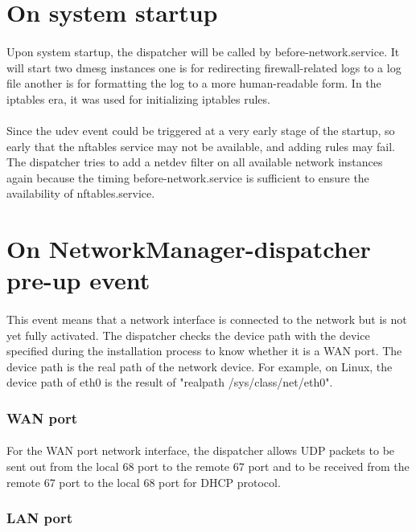 \documentclass[mscthesis]{usiinfthesis}
\begin{document}
\section{On system startup}
\paragraph{}
Upon system startup, the dispatcher will be called by before-network.service. It will start two dmesg instances one is for redirecting firewall-related logs to a log file another is for formatting the log to a more human-readable form. In the iptables era, it was used for initializing iptables rules.
\paragraph{}
Since the udev event could be triggered at a very early stage of the startup, so early that the nftables service may not be available, and adding rules may fail. The dispatcher tries to add a netdev filter on all available network instances again because the timing before-network.service is sufficient to ensure the availability of nftables.service.

\section{On NetworkManager-dispatcher pre-up event}
\paragraph{}
This event means that a network interface is connected to the network but is not yet fully activated. The dispatcher checks the device path with the device specified during the installation process to know whether it is a WAN port. The device path is the real path of the network device. For example, on Linux, the device path of eth0 is the result of "realpath /sys/class/net/eth0".
\subsubsection{WAN port}
\paragraph{}
For the WAN port network interface, the dispatcher allows UDP packets to be sent out from the local 68 port to the remote 67 port and to be received from the remote 67 port to the local 68 port for DHCP protocol.
\subsubsection{LAN port}
\end{document}
